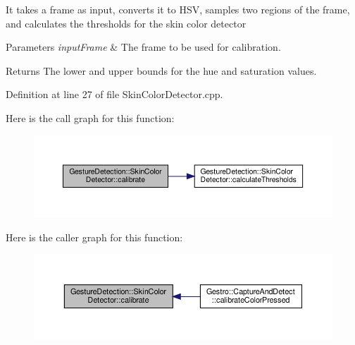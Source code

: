 It takes a frame as input, converts it to H\+SV, samples two regions of the frame, and calculates the thresholds for the skin color detector


\begin{DoxyParams}{Parameters}
{\em input\+Frame} & The frame to be used for calibration.\\
\hline
\end{DoxyParams}
\begin{DoxyReturn}{Returns}
The lower and upper bounds for the hue and saturation values. 
\end{DoxyReturn}


Definition at line 27 of file Skin\+Color\+Detector.\+cpp.

Here is the call graph for this function\+:
\nopagebreak
\begin{figure}[H]
\begin{center}
\leavevmode
\includegraphics[width=350pt]{class_gesture_detection_1_1_skin_color_detector_ae8b3880d1d75b07e356cd7d1ff128ed9_cgraph}
\end{center}
\end{figure}
Here is the caller graph for this function\+:
\nopagebreak
\begin{figure}[H]
\begin{center}
\leavevmode
\includegraphics[width=350pt]{class_gesture_detection_1_1_skin_color_detector_ae8b3880d1d75b07e356cd7d1ff128ed9_icgraph}
\end{center}
\end{figure}
\mbox{\label{class_gesture_detection_1_1_skin_color_detector_a4739dae25a983fb35a972f3c0ff8faaf}} 
